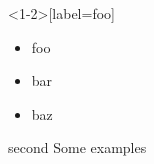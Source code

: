 \documentclass{beamer}
\begin{document}
\begin{frame}<1-2>[label=foo]
 \begin{itemize}
  \item<1> foo
  \item<2> bar
   \item<3> baz
 \end{itemize}
\end{frame}

\begin{frame}{second}
  Some examples
\end{frame}

\end{document}
